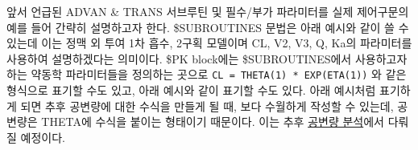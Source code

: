 \documentclass[
  10pt,
  krantz2,
  a4paper]{krantz}
\newenvironment{Shaded}{\begin{snugshade}}{\end{snugshade}}
\newcommand{\DecValTok}[1]{\textcolor[rgb]{0.00,0.00,0.81}{#1}}
\newcommand{\KeywordTok}[1]{\textcolor[rgb]{0.13,0.29,0.53}{\textbf{#1}}}
\newcommand{\NormalTok}[1]{#1}
\newcommand{\OperatorTok}[1]{\textcolor[rgb]{0.81,0.36,0.00}{\textbf{#1}}}
\newcommand{\StringTok}[1]{\textcolor[rgb]{0.31,0.60,0.02}{#1}}
\newenvironment{Shaded}{\begin{snugshade}}{\end{snugshade}}
\theoremstyle{definition}
\theoremstyle{definition}
\theoremstyle{definition}
\theoremstyle{remark}
\begin{document}
앞서 언급된 ADVAN \& TRANS 서브루틴 및 필수/부가 파라미터를 실제 제어구문의 예를 들어 간략히 설명하고자 한다. \$SUBROUTINES 문법은 아래 예시와 같이 쓸 수 있는데 이는 정맥 외 투여 1차 흡수, 2구획 모델이며 CL, V2, V3, Q, Ka의 파라미터를 사용하여 설명하겠다는 의미이다. \$PK block에는 \$SUBROUTINES에서 사용하고자 하는 약동학 파라미터들을 정의하는 곳으로 \texttt{CL\ =\ THETA(1)\ *\ EXP(ETA(1))} 와 같은 형식으로 표기할 수도 있고, 아래 예시와 같이 표기할 수도 있다. 아래 예시처럼 표기하게 되면 추후 공변량에 대한 수식을 만들게 될 때, 보다 수월하게 작성할 수 있는데, 공변량은 THETA에 수식을 붙이는 형태이기 때문이다. 이는 추후 \protect\hyperlink{covariate-analysis}{공변량 분석}에서 다뤄질 예정이다.

\begin{Shaded}
\end{Shaded}
\end{document}
